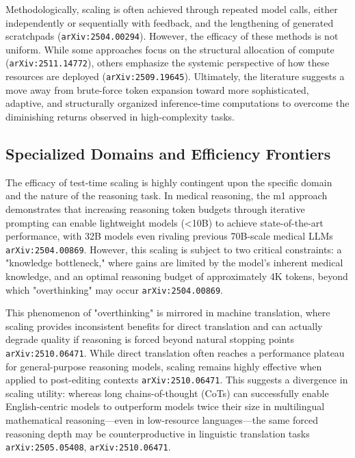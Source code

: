 \documentclass[11pt]{article}
\begin{document}
Methodologically, scaling is often achieved through repeated model calls, either independently or sequentially with feedback, and the lengthening of generated scratchpads (\texttt{arXiv:2504.00294}). However, the efficacy of these methods is not uniform. While some approaches focus on the structural allocation of compute (\texttt{arXiv:2511.14772}), others emphasize the systemic perspective of how these resources are deployed (\texttt{arXiv:2509.19645}). Ultimately, the literature suggests a move away from brute-force token expansion toward more sophisticated, adaptive, and structurally organized inference-time computations to overcome the diminishing returns observed in high-complexity tasks.

\subsection{Specialized Domains and Efficiency Frontiers}

The efficacy of test-time scaling is highly contingent upon the specific domain and the nature of the reasoning task. In medical reasoning, the m1 approach demonstrates that increasing reasoning token budgets through iterative prompting can enable lightweight models (<10B) to achieve state-of-the-art performance, with 32B models even rivaling previous 70B-scale medical LLMs \texttt{arXiv:2504.00869}. However, this scaling is subject to two critical constraints: a "knowledge bottleneck," where gains are limited by the model's inherent medical knowledge, and an optimal reasoning budget of approximately 4K tokens, beyond which "overthinking" may occur \texttt{arXiv:2504.00869}.

This phenomenon of "overthinking" is mirrored in machine translation, where scaling provides inconsistent benefits for direct translation and can actually degrade quality if reasoning is forced beyond natural stopping points \texttt{arXiv:2510.06471}. While direct translation often reaches a performance plateau for general-purpose reasoning models, scaling remains highly effective when applied to post-editing contexts \texttt{arXiv:2510.06471}. This suggests a divergence in scaling utility: whereas long chains-of-thought (CoTs) can successfully enable English-centric models to outperform models twice their size in multilingual mathematical reasoning—even in low-resource languages—the same forced reasoning depth may be counterproductive in linguistic translation tasks \texttt{arXiv:2505.05408}, \texttt{arXiv:2510.06471}.
\end{document}

